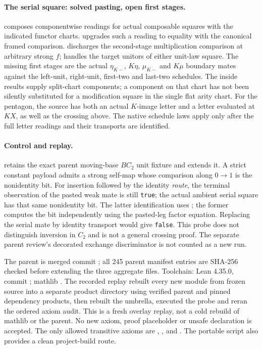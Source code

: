 \documentclass[10pt]{article}
\begin{document}
\paragraph{The serial square: solved pasting, open first stages.}
 composes componentwise readings for actual composable squares with the indicated functor charts.  upgrades such a reading to equality with the canonical framed comparison.  discharges the second-stage multiplication comparison at arbitrary strong $f$;  handles the target unitors of either unit-law square. The missing first stages are the actual $\eta_{K-}$, $K\eta$, $\mu_{K-}$ and $K\mu$ boundary mates against the left-unit, right-unit, first-two and last-two schedules. The inside results supply split-chart components; a component on that chart has not been silently substituted for a modification square in the single flat arity chart. For the pentagon, the source has both an actual $K$-image letter and a letter evaluated at $KX$, as well as the crossing above. The native schedule laws apply only after the full letter readings and their transports are identified.

\paragraph{Control and replay.}
 retains the exact parent moving-base $BC_2$ unit fixture and extends it. A strict constant payload admits a strong self-map whose comparison along $0\to1$ is the nonidentity bit. For insertion followed by the identity \emph{route}, the terminal observation of the pasted weak mate is still \texttt{true}; the actual ambient serial square has that same nonidentity bit. The latter identification uses ; the former computes the bit independently using the pasted-leg factor equation. Replacing the serial mate by identity transport would give \texttt{false}. This probe does not distinguish inversion in $C_2$ and is not a general crossing proof. The separate parent review's decorated exchange discriminator is not counted as a new run.
\par The parent is merged commit ; all 245 parent manifest entries are SHA-256 checked before extending the three aggregate files. Toolchain: Lean 4.35.0, commit ; mathlib . The recorded replay rebuilt every new module from frozen source into a separate product directory using verified parent and pinned dependency products, then rebuilt the umbrella, executed the probe and reran the ordered axiom audit. This is a fresh overlay replay, not a cold rebuild of mathlib or the parent. No new axiom, proof placeholder or unsafe declaration is accepted. The only allowed transitive axioms are , , and . The portable script also provides a clean project-build route.
\end{document}
